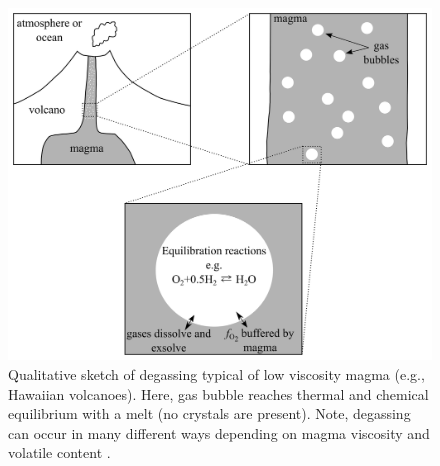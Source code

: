 \begin{figure}
    \centering
    \includegraphics[width=\textwidth]{tex/3methane/figures/whole_thing_pretty_filled_v2.pdf}
    \caption{Qualitative sketch of degassing typical of low viscosity magma (e.g., Hawaiian volcanoes). Here, gas bubble reaches thermal and chemical equilibrium with a melt (no crystals are present). Note, degassing can occur in many different ways depending on magma viscosity and volatile content \citep{Gonnermann_2013}.}
    \label{fig:imagine}
\end{figure}

